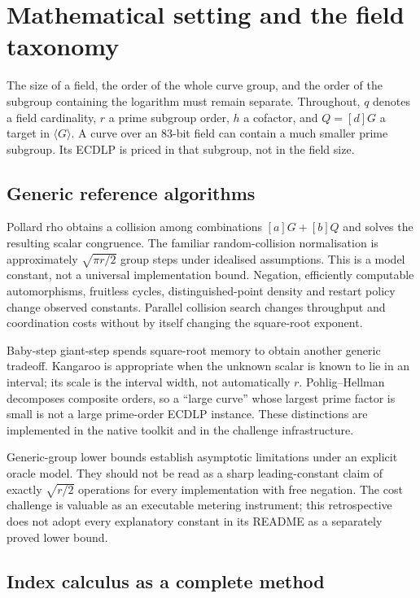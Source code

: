 \section{Mathematical setting and the field taxonomy}\label{sec:math}

The size of a field, the order of the whole curve group, and the order of
the subgroup containing the logarithm must remain separate. Throughout,
$q$ denotes a field cardinality, $r$ a prime subgroup order, $h$ a
cofactor, and $Q=[d]G$ a target in $\langle G\rangle$. A curve over an
83-bit field can contain a much smaller prime subgroup. Its ECDLP is
priced in that subgroup, not in the field size.

\subsection{Generic reference algorithms}

Pollard rho obtains a collision among combinations $[a]G+[b]Q$ and solves
the resulting scalar congruence. The familiar random-collision
normalisation is approximately $\sqrt{\pi r/2}$ group steps under idealised
assumptions. This is a model constant, not a universal implementation
bound. Negation, efficiently computable automorphisms, fruitless cycles,
distinguished-point density and restart policy change observed constants.
Parallel collision search changes throughput and coordination costs
without by itself changing the square-root exponent.\cite{pollard1978,vanoorschot1999}

Baby-step giant-step spends square-root memory to obtain another generic
tradeoff. Kangaroo is appropriate when the unknown scalar is known to lie
in an interval; its scale is the interval width, not automatically $r$.
Pohlig--Hellman decomposes composite orders, so a ``large curve'' whose
largest prime factor is small is not a large prime-order ECDLP instance.
These distinctions are implemented in the native toolkit and in the
challenge infrastructure.

Generic-group lower bounds establish asymptotic limitations under an
explicit oracle model. They should not be read as a sharp leading-constant
claim of exactly $\sqrt{r/2}$ operations for every implementation with free
negation. The cost challenge is valuable as an executable metering
instrument; this retrospective does not adopt every explanatory constant
in its README as a separately proved lower bound.

\subsection{Index calculus as a complete method}

